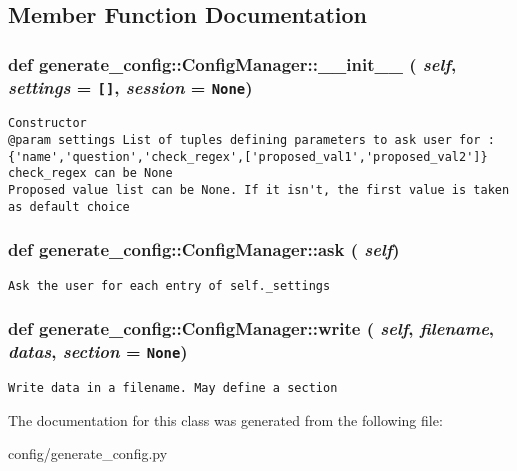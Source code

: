\subsection{Member Function Documentation}
\hypertarget{classgenerate__config_1_1ConfigManager_9d306a6d2e086a1dd9175423ad415798}{
\subsubsection[\_\-\_\-init\_\-\_\-]{\setlength{\rightskip}{0pt plus 5cm}def generate\_\-config::ConfigManager::\_\-\_\-init\_\-\_\- ( {\em self}, \/   {\em settings} = {\tt \mbox{[}\mbox{]}}, \/   {\em session} = {\tt None})}}
\label{classgenerate__config_1_1ConfigManager_9d306a6d2e086a1dd9175423ad415798}




\footnotesize\begin{verbatim}
Constructor 
@param settings List of tuples defining parameters to ask user for : {'name','question','check_regex',['proposed_val1','proposed_val2']}
check_regex can be None
Proposed value list can be None. If it isn't, the first value is taken as default choice
\end{verbatim}
\normalsize
 \hypertarget{classgenerate__config_1_1ConfigManager_277e7238684d6750957bf2981e0eec14}{
\subsubsection[ask]{\setlength{\rightskip}{0pt plus 5cm}def generate\_\-config::ConfigManager::ask ( {\em self})}}
\label{classgenerate__config_1_1ConfigManager_277e7238684d6750957bf2981e0eec14}




\footnotesize\begin{verbatim}
Ask the user for each entry of self._settings
\end{verbatim}
\normalsize
 \hypertarget{classgenerate__config_1_1ConfigManager_50916dd9f4420c45c85048c3448dfd9e}{
\subsubsection[write]{\setlength{\rightskip}{0pt plus 5cm}def generate\_\-config::ConfigManager::write ( {\em self}, \/   {\em filename}, \/   {\em datas}, \/   {\em section} = {\tt None})}}
\label{classgenerate__config_1_1ConfigManager_50916dd9f4420c45c85048c3448dfd9e}




\footnotesize\begin{verbatim}
Write data in a filename. May define a section
\end{verbatim}
\normalsize
 

The documentation for this class was generated from the following file:\begin{CompactItemize}
\item 
config/generate\_\-config.py\end{CompactItemize}
